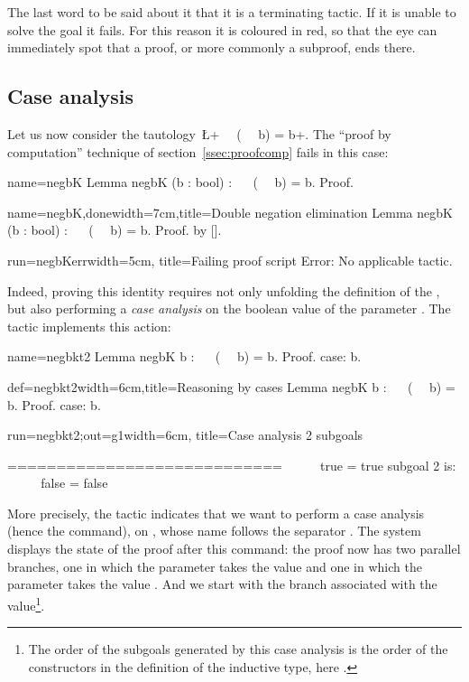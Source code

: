 The last word to be said about  it that it is a terminating
tactic.  If it is unable to solve the goal it fails.  For this reason
it is coloured in red, so that the eye can immediately spot that a 
proof, or more commonly a subproof, ends there.

\subsection{Case analysis}\label{ssec:case}
Let us now consider the tautology~\L+~~ (~~ b) = b+. The
``proof by computation'' technique of section~\ref{ssec:proofcomp}
fails in this case:

\begin{coqdef}{name=negbK}
Lemma negbK (b : bool) : ~~ (~~ b) = b.
Proof.
\end{coqdef}
\begin{coq}{name=negbK,done}{width=7cm,title=Double negation elimination}
Lemma negbK (b : bool) : ~~ (~~ b) = b.
Proof. by [].
\end{coq}
\begin{coqout}{run=negbKerr}{width=5cm, title=Failing proof script}
Error: No applicable
tactic.
\end{coqout}

Indeed, proving this identity requires not only unfolding the
definition of the , but also performing a \emph{case analysis}
on the boolean value of the parameter . The tactic 
implements this action:

\begin{coqdef}{name=negbkt2}
Lemma negbK b : ~~ (~~ b) = b.
Proof.
case: b.
\end{coqdef}
\begin{coq}{def=negbkt2}{width=6cm,title=Reasoning by cases}
Lemma negbK b : ~~ (~~ b) = b.
Proof.
case: b.
$~$
$~$
$~$
\end{coq}
\begin{coqout}{run=negbkt2;out=g1}{width=6cm, title=Case analysis}
2 subgoals

  ============================
   ~~ ~~ true = true
subgoal 2 is:
 ~~ ~~ false = false
\end{coqout}

More precisely, the tactic  indicates that we want to
perform a case analysis (hence the  command), on , whose
name follows the separator \C{:}. The \Coq{} system displays the state
of the proof after this command: the proof now has two parallel
branches, one in which the parameter  takes the value  and
one in which the parameter  takes the value . And we
start with the branch associated with the 
value\footnote{The order of the subgoals generated by this case
  analysis is the order of the constructors in the definition of the
  inductive type, here .}.

